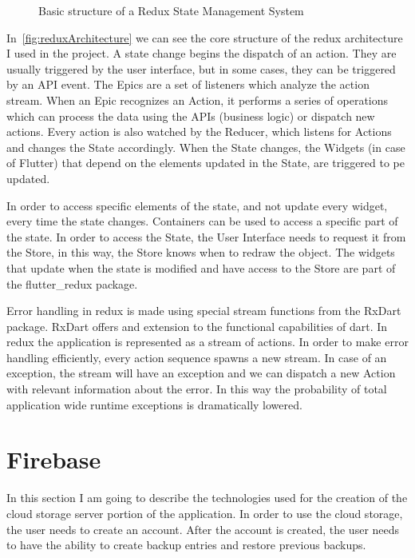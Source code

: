 \documentclass[a4paper,12pt]{report}
\begin{document}
\begin{figure}[H]
    \centering
    \scalebox{0.75}{}
    \caption{Basic structure of a Redux State Management System}\label{fig:reduxArchitecture}
\end{figure}

In~\autoref{fig:reduxArchitecture} we can see the core structure of the redux
architecture I used in the project. A state change begins the dispatch of an
action. They are usually triggered by the user interface, but in some cases,
they can be triggered by an API event. The Epics are a set of listeners which
analyze the action stream. When an Epic recognizes an Action, it performs a
series of operations which can process the data using the APIs (business logic)
or dispatch new actions. Every action is also watched by the Reducer, which
listens for Actions and changes the State accordingly. When the State changes,
the Widgets (in case of Flutter) that depend on the elements updated in the
State, are triggered to pe updated.

In order to access specific elements of the state, and not update every widget,
every time the state changes. Containers can be used to access a specific part
of the state. In order to access the State, the User Interface needs to request
it from the Store, in this way, the Store knows when to redraw the object. The
widgets that update when the state is modified and have access to the Store are
part of the flutter\_redux package\cite{flutterReduxDocs}.

Error handling in redux is made using special stream functions from the RxDart
package\cite{rxDartDocs}. RxDart offers and extension to the functional
capabilities of dart. In redux the application is represented as a stream of
actions. In order to make error handling efficiently, every action sequence
spawns a new stream. In case of an exception, the stream will have an exception
and we can dispatch a new Action with relevant information about the error. In
this way the probability of total application wide runtime exceptions is
dramatically lowered.

\section{Firebase}

In this section I am going to describe the technologies used for the creation
of the cloud storage server portion of the application. In order to use the
cloud storage, the user needs to create an account. After the account is
created, the user needs to have the ability to create backup entries and
restore previous backups.
\end{document}
